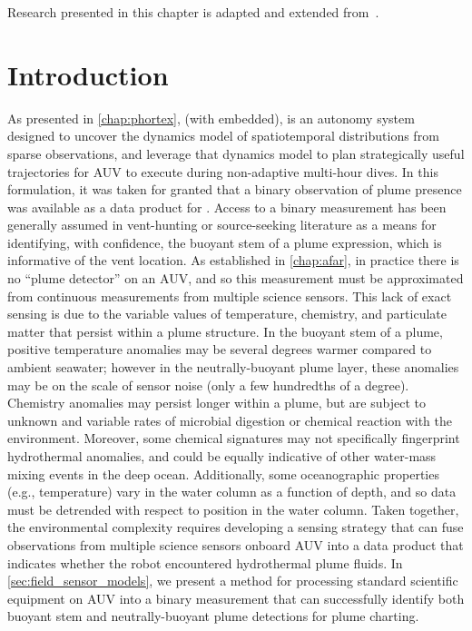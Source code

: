 Research presented in this chapter is adapted and extended from~\cite{preston2022physically}.   


\section{Introduction}
As presented in \cref{chap:phortex}, \PHORTEX (with \PHUMES embedded), is an autonomy system designed to uncover the dynamics model of spatiotemporal distributions from sparse observations, and leverage that dynamics model to plan strategically useful trajectories for AUV \Sentry to execute during non-adaptive multi-hour dives. In this formulation, it was taken for granted that a binary observation of plume presence was available as a data product for \PHUMES. Access to a binary measurement has been generally assumed in vent-hunting or source-seeking literature\autocite{tian2014behavior,saigol2009information,jakuba2007stochastic} as a means for identifying, with confidence, the buoyant stem of a plume expression, which is informative of the vent location. As established in \cref{chap:afar}, in practice there is no ``plume detector'' on an AUV, and so this measurement must be approximated from continuous measurements from multiple science sensors. This lack of exact sensing is due to the variable values of temperature, chemistry, and particulate matter that persist within a plume structure. In the buoyant stem of a plume, positive temperature anomalies may be several degrees warmer compared to ambient seawater; however in the neutrally-buoyant plume layer, these anomalies may be on the scale of sensor noise (only a few hundredths of a degree). Chemistry anomalies may persist longer within a plume, but are subject to unknown and variable rates of microbial digestion or chemical reaction with the environment. Moreover, some chemical signatures may not specifically fingerprint hydrothermal anomalies, and could be equally indicative of other water-mass mixing events in the deep ocean. Additionally, some oceanographic properties (e.g., temperature) vary in the water column as a function of depth, and so data must be detrended with respect to position in the water column. Taken together, the environmental complexity requires developing a sensing strategy that can fuse observations from multiple science sensors onboard AUV \Sentry into a data product that indicates whether the robot encountered hydrothermal plume fluids. In \cref{sec:field_sensor_models}, we present a method for processing standard scientific equipment on AUV \Sentry into a binary measurement that can successfully identify both buoyant stem and neutrally-buoyant plume detections for plume charting.

